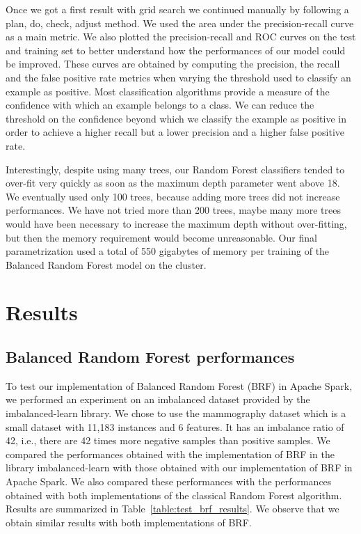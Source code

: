 \documentclass[conference]{IEEEtran}
\begin{document}
Once we got a first result with grid search we continued manually by
following a plan, do, check, adjust method. We used the area under the precision-recall curve as a main metric. We also plotted the precision-recall and ROC curves on the test and training set to better understand how the performances of our model could be improved. These curves are obtained by computing the precision, the recall and the false positive rate metrics when varying the threshold used to classify an example as positive. Most classification algorithms provide a measure of the confidence with which an example belongs to a class. We can reduce the threshold on the confidence beyond which we classify the example as positive in order to achieve a higher recall but a lower precision and a higher false positive rate.

Interestingly, despite using many trees, our Random Forest classifiers
tended to over-fit very quickly as soon as the maximum depth parameter went
above 18. We eventually used only 100 trees, because adding more trees did
not increase performances. We have not tried more than 200 trees, maybe
many more trees would have been necessary to increase the maximum depth
without over-fitting, but then the memory requirement would become unreasonable.
Our final parametrization used a total of 550 gigabytes of memory per training of the Balanced Random Forest model on the cluster.


\section{Results}
\label{sec:results}


\subsection{Balanced Random Forest performances}

To test our implementation of Balanced Random Forest (BRF) in Apache Spark, we performed an experiment on an imbalanced dataset provided by the imbalanced-learn library.
We chose to use the mammography dataset\cite{Woods1993} which is a small dataset with 11,183 instances and 6 features. It has an imbalance ratio of 42, i.e., there are 42 times more negative samples than positive samples. We compared the performances obtained with the implementation of BRF in the library imbalanced-learn with those obtained with our implementation of BRF in Apache Spark. We also compared these performances with the performances obtained with both implementations of the classical Random Forest algorithm.
Results are summarized in Table~\ref{table:test_brf_results}. We observe that we obtain similar results with both implementations of BRF.
\end{document}
